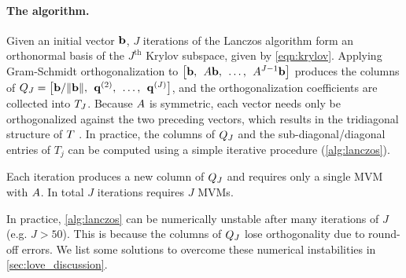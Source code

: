 \paragraph{The algorithm.}
Given an initial vector $\mathbf{b}$, $J$ iterations of the Lanczos algorithm form an orthonormal basis of the $J^\text{th}$ Krylov subspace, given by \cref{eqn:krylov}.
Applying Gram-Schmidt orthogonalization to $\left[ \mathbf{b}, \:\: A \mathbf{b}, \:\: \ldots, \:\: A^{J-1} \mathbf{b} \right]$ produces the columns of $Q_J = \left[ \mathbf{b}/\Vert \mathbf{b} \Vert, \:\: \mathbf{q}^{(2)}, \:\: \ldots, \:\: \mathbf{q}^{(J)} \right]$, and the orthogonalization coefficients are collected into $T_J$.
Because $A$ is symmetric, each vector needs only be orthogonalized against the two preceding vectors, which results in the tridiagonal structure of $T$ \cite{golub2012matrix}.
In practice, the columns of $Q_J$ and the sub-diagonal/diagonal entries of $T_j$ can be computed using a simple iterative procedure (\cref{alg:lanczos}).
%

%
Each iteration produces a new column of $Q_J$ and requires only a single MVM with $A$.
In total $J$ iterations requires $J$ MVMs.

In practice, \cref{alg:lanczos} can be numerically unstable after many iterations of $J$ (e.g. $J > 50$).
This is because the columns of $Q_J$ lose orthogonality due to round-off errors.
We list some solutions to overcome these numerical instabilities in \cref{sec:love_discussion}.



